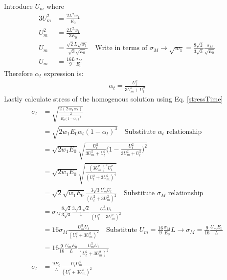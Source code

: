\documentclass[12pt,3p]{article}
\numberwithin{equation}{section}
\begin{document}
Introduce $U_m$ where 
\begin{align*}
3 U_m^2 &= \frac{2 L^2 w_1}{E_0} \\
U_m^2 &= \frac{2 L^2 w_1}{3 E_0} \\
U_m &= \frac{\sqrt{2} L \sqrt{w_1}}{\sqrt{3} \sqrt{E_0}} \quad \text{Write in terms of } \sigma_M \rightarrow \sqrt{w_1} = \frac{8 \sqrt{2}}{3 \sqrt{3}} \frac{\sigma_M}{\sqrt{E_0}} \\ 
U_m &= \frac{16 L}{9} \frac{\sigma_M}{E_0} 
\end{align*}
Therefore $\alpha_t$ expression is:
\begin{align*}
\alpha_t = \frac{U_t^2}{3 U_m^2+ U_t^2}
\end{align*}
Lastly calculate stress of the homogenous solution using Eq. \ref{stressTime}
\begin{align*}
\sigma_t &= \sqrt{\frac{2 (2 w_1 \alpha_t)}{\frac{2}{E_0 (1 - \alpha_t)^3} }} \\
		&= \sqrt{2 w_1 E_0 \alpha_t (1- \alpha_t)^3} \quad \text{Substitute } \alpha_t \text{ relationship} \\
		&= \sqrt{2 w_1 E_0} \sqrt{\frac{U_t^2}{3 U_m^2+ U_t^2} \bigg( 1 - \frac{U_t^2}{3 U_m^2+ U_t^2} \bigg)^2 } \\
		&= \sqrt{2 w_1 E_0} \sqrt{\frac{(3 U_m^2)^3 U_t^2}{(U_t^2 + 3 U_m^2)^4}} \\
		&= \sqrt{2} \sqrt{w_1 E_0} \frac{3 \sqrt{3} U_m^3 U_t}{(U_t^2 + 3 U_m^2)^2} \quad \text{Substitute } \sigma_M \text{ relationship} \\
		&= \sigma_M \frac{8 \sqrt{2}}{3 \sqrt{3}} \frac{3 \sqrt{3} \sqrt{2}}{1} \frac{U_m^3 U_t}{(U_t^2 + 3 U_m^2)^2} \\
		&= 16 \sigma_M \frac{U_m^3 U_t}{(U_t^2 + 3 U_m^2)^2} \quad \text{Substitute } U_m = \frac{16}{9} \frac{\sigma_M}{E_0} L \rightarrow \sigma_M = \frac{9}{16} \frac{U_m E_0}{L} \\
		&= 16 \frac{9}{16} \frac{U_m E_0}{L}  \frac{U_m^3 U_t}{(U_t^2 + 3 U_m^2)^2} \\
\sigma_t &= \frac{9 E_0}{L} \frac{U_t U_m^4}{(U_t^2 + 3 U_m^2)^2}
\end{align*}
\end{document}
